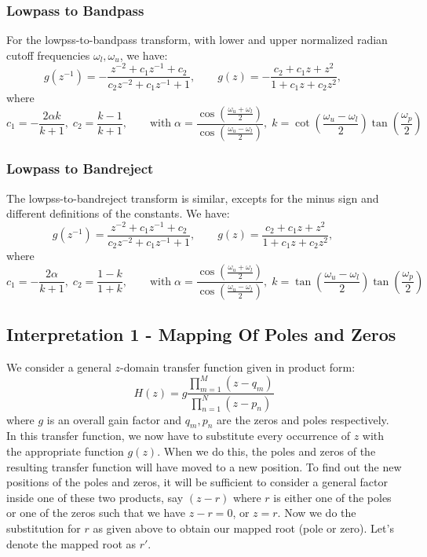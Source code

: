 \subsubsection{Lowpass to Bandpass}
For the lowpss-to-bandpass transform, with lower and upper normalized radian cutoff frequencies $\omega_l, \omega_u$, we have:
\begin{equation}
g(z^{-1}) = - \frac{z^{-2} + c_1 z^{-1} + c_2}{c_2 z^{-2} + c_1 z^{-1} + 1}, \qquad
g(z)      = - \frac{c_2 + c_1 z + z^2}{1 + c_1 z + c_2 z^2},                 \qquad
\end{equation}
where
\begin{equation}
 c_1 = -\frac{2 \alpha k}{k+1}, \; c_2 = \frac{k-1}{k+1}, \qquad \text{with} \;
 \alpha = \frac{\cos(\frac{\omega_u+\omega_l}{2})}{\cos(\frac{\omega_u-\omega_l}{2})}, \;
 k = \cot \left( \frac{\omega_u-\omega_l}{2} \right) \tan \left( \frac{\omega_p}{2} \right)
\end{equation}

\subsubsection{Lowpass to Bandreject}
The lowpss-to-bandreject transform is similar, excepts for the minus sign and different definitions of the constants. We have:
\begin{equation}
g(z^{-1}) = \frac{z^{-2} + c_1 z^{-1} + c_2}{c_2 z^{-2} + c_1 z^{-1} + 1}, \qquad
g(z)      = \frac{c_2 + c_1 z + z^2}{1 + c_1 z + c_2 z^2},                 \qquad
\end{equation}
where
\begin{equation}
 c_1 = -\frac{2 \alpha}{k+1}, \; c_2 = \frac{1-k}{1+k}, \qquad \text{with} \;
 \alpha = \frac{\cos(\frac{\omega_u+\omega_l}{2})}{\cos(\frac{\omega_u-\omega_l}{2})}, \;
 k = \tan \left( \frac{\omega_u-\omega_l}{2} \right) \tan \left( \frac{\omega_p}{2} \right)
\end{equation}

\subsection{Interpretation 1 - Mapping Of Poles and Zeros}
We consider a general $z$-domain transfer function given in product form:
\begin{equation}
H(z) = g \frac{\prod_{m=1}^M (z-q_m)}{\prod_{n=1}^N (z - p_n)}
\end{equation}
where $g$ is an overall gain factor and $q_m, p_n$ are the zeros and poles respectively. In this transfer function, we now have to substitute every occurrence of $z$ with the appropriate function $g(z)$. When we do this, the poles and zeros of the resulting transfer function will have moved to a new position. To find out the new positions of the poles and zeros, it will be sufficient to consider a general factor inside one of these two products, say $(z-r)$ where $r$ is either one of the poles or one of the zeros such that we have $z-r=0$, or $z=r$. Now we do the substitution for $r$ as given above to obtain our mapped root (pole or zero). Let's denote the mapped root as $r'$. 
